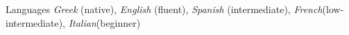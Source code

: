 \documentclass{resume}
\begin{document}




   







\begin{rSection}{Languages}
    \textit{Greek} (native), \textit{English} (fluent), \textit{Spanish} (intermediate), \textit{French}(low-intermediate), \textit{Italian}(beginner) \\
\end{rSection}
\end{document}
